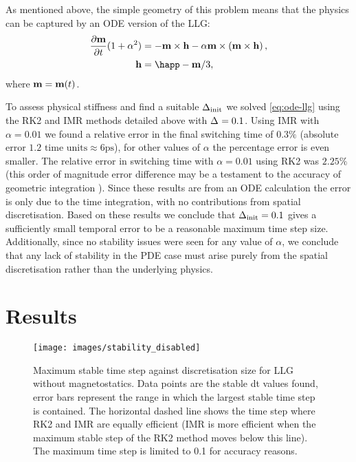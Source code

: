 As mentioned above, the simple geometry of this problem means that the physics can be captured by an ODE version of the LLG:
\begin{equation}
  \label{eq:ode-llg}
  \begin{aligned}
    \dmdt (1 + \dampc^2) &= - \mv \times \hv - \dampc \mv \times \left( \mv \times \hv \right), \\
    \hv &= \happ - \mv/3,
  \end{aligned}
\end{equation}
where $\mathbf{m} = \mathbf{m}(t)$.

To assess physical stiffness and find a suitable $\Delta_{\text{init}}$ we solved \cref{eq:ode-llg} using the RK2 and IMR methods detailed above with $\Delta_{} = 0.1$.
Using IMR with $\alpha = 0.01$ we found a relative error in the final switching time of $0.3\%$ (absolute error  $1.2 \text{ time units} \approx 6\text{ps}$), for other values of $\alpha$ the percentage error is even smaller.
The relative error in switching time with $\alpha = 0.01$ using RK2 was $2.25\%$ (this order of magnitude error difference may be a testament to the accuracy of geometric integration \cite{DAquino2005}).
Since these results are from an ODE calculation the error is only due to the time integration, with no contributions from spatial discretisation.
Based on these results we conclude that $\Delta_{\text{init}} = 0.1$ gives a sufficiently small temporal error to be a reasonable maximum time step size.
Additionally, since no stability issues were seen for any value of $\alpha$, we conclude that any lack of stability in the PDE case must arise purely from the spatial discretisation rather than the underlying physics.



\section{Results}


\begin{figure}
  \centering
  \texttt{[image: images/stability\_disabled]}
  \caption{Maximum stable time step against discretisation size for LLG without magnetostatics. Data points are the stable dt values found, error bars represent the range in which the largest stable time step is contained. The horizontal dashed line shows the time step where RK2 and IMR are equally efficient (IMR is more efficient when the maximum stable step of the RK2 method moves below this line). The maximum time step is limited to 0.1 for accuracy reasons.}
  \label{fig:no-hms-stability}
\end{figure}


